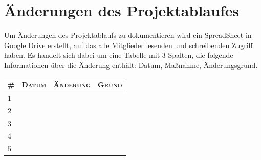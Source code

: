 \documentclass[lang=ngerman,inputenc=utf8,fontsize=10pt]{ldvarticle}
\begin{document}
\section{Änderungen des Projektablaufes}
Um Änderungen des Projektablaufs zu dokumentieren wird ein SpreadSheet in Google Drive erstellt, auf das alle Mitglieder lesenden und schreibenden Zugriff haben. Es handelt sich dabei um eine Tabelle mit 3 Spalten, die folgende Informationen über die Änderung enthält: Datum, Maßnahme, Änderungsgrund.



\begin{tabular}[htbp]{|p{}||p{}|p{}|p{}|}
\hline
\textsc{\#} & \textsc{Datum} & \textsc{Änderung} & \textsc{Grund} \\
\hline
\hline
1 & & & \\[1em]
\hline
2 & & & \\[1em]
\hline
3 & & & \\[1em]
\hline
4 & & & \\[1em]
\hline
5 & & & \\[1em]
\hline
\end{tabular}
\end{document}
